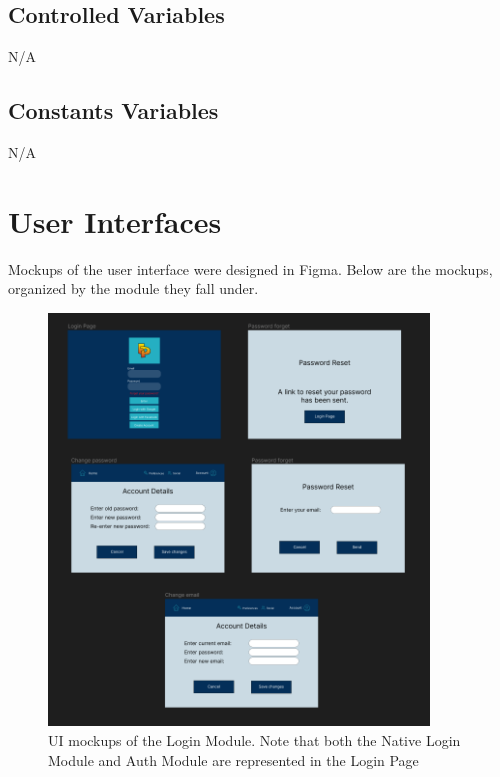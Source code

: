 \documentclass[12pt, titlepage]{article}
\begin{document}
\subsection{Controlled Variables}
N/A

\subsection{Constants Variables}
N/A

\section{User Interfaces}

Mockups of the user interface were designed in Figma. Below are the mockups, organized by the module they fall under.

\begin{figure}[H]
	\centering
	\includegraphics[width=0.9\textwidth]{figma/login.png}
	\caption{UI mockups of the Login Module. Note that both the Native Login Module and Auth Module are represented in the Login Page}
	\label{FigUH}
\end{figure}
\end{document}
